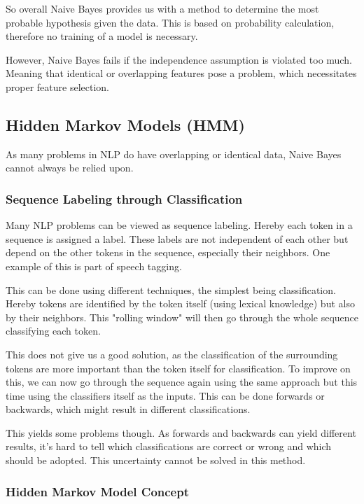 \documentclass[
../../NLP4W_Summary.tex,
]
{subfiles}
\begin{document}
So overall Naive Bayes provides us with a method to determine the most probable hypothesis given the data. This is based on probability calculation, therefore no training of a model is necessary.

However, Naive Bayes fails if the independence assumption is violated too much. Meaning that identical or overlapping features pose a problem, which necessitates proper feature selection.

\newpage
\subsection{Hidden Markov Models (HMM)}

As many problems in NLP do have overlapping or identical data, Naive Bayes cannot always be relied upon. 

\subsubsection{Sequence Labeling through Classification}

Many NLP problems can be viewed as sequence labeling. Hereby each token in a sequence is assigned a label. These labels are not independent of each other but depend on the other tokens in the sequence, especially their neighbors. One example of this is part of speech tagging.

This can be done using different techniques, the simplest being classification. Hereby tokens are identified by the token itself (using lexical knowledge) but also by their neighbors. This "rolling window" will then go through the whole sequence classifying each token.

This does not give us a good solution, as the classification of the surrounding tokens are more important than the token itself for classification. To improve on this, we can now go through the sequence again using the same approach but this time using the classifiers itself as the inputs. This can be done forwards or backwards, which might result in different classifications.

This yields some problems though. As forwards and backwards can yield different results, it's hard to tell which classifications are correct or wrong and which should be adopted. This uncertainty cannot be solved in this method.

\subsubsection{Hidden Markov Model Concept}
\end{document}
